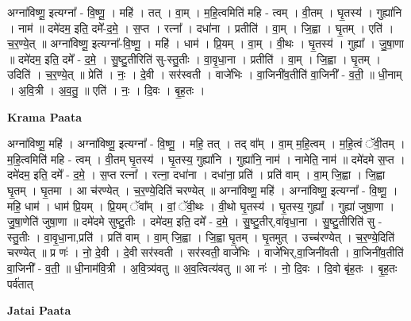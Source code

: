 \documentclass[17pt]{extarticle}
\begin{document}
अग्ना॑विष्णू॒ इत्यग्ना᳚ - वि॒ष्णू॒ । महि॑ । तत् । वा॒म् । म॒हि॒त्वमिति॑ महि - त्वम् । वी॒तम् । घृ॒तस्य॑ । गुह्या॑नि । नाम॑ ॥ दमे॑दम॒ इति॒ दमे᳚-द॒मे॒ । स॒प्त । रत्ना᳚ । दधा॑ना । प्रतीति॑ । वा॒म् । जि॒ह्वा । घृ॒तम् । एति॑ । च॒र॒ण्ये॒त् ॥ अग्ना॑विष्णू॒ इत्यग्ना᳚-वि॒ष्णू॒ । महि॑ । धाम॑ । प्रि॒यम् । वा॒म् । वी॒थः । घृ॒तस्य॑ । गुह्या᳚ । जु॒षा॒णा ॥ दमे॑दम॒ इति॒ दमे᳚ - द॒मे॒ । सु॒ष्टु॒तीरिति॑ सु-स्तु॒तीः । वा॒वृ॒धा॒ना । प्रतीति॑ । वा॒म् । जि॒ह्वा । घृ॒तम् । उदिति॑ । च॒र॒ण्ये॒त् ॥ प्रेति॑ । नः॒ । दे॒वी । सर॑स्वती । वाजे॑भिः । वा॒जिनी॑व॒तीति॑ वा॒जिनी᳚ - व॒ती॒ ॥ धी॒नाम् । अ॒वि॒त्री । अ॒व॒तु॒ ॥ एति॑ । नः॒ । दि॒वः । बृ॒ह॒तः ।  \newline


\textbf{Krama Paata} \newline

अग्ना॑विष्णू॒ महि॑ । अग्ना॑विष्णू॒ इत्यग्ना᳚ - वि॒ष्णू॒ । महि॒ तत् । तद् वा᳚म् । वा॒म् म॒हि॒त्वम् । म॒हि॒त्वं ॅवी॒तम् । म॒हि॒त्वमिति॑ महि - त्वम् । वी॒तम् घृ॒तस्य॑ । घृ॒तस्य॒ गुह्या॑नि । गुह्या॑नि॒ नाम॑ । नामेति॒ नाम॑ ॥ दमे॑दमे स॒प्त । दमे॑दम॒ इति॒ दमे᳚ - द॒मे॒ । स॒प्त रत्ना᳚ । रत्ना॒ दधा॑ना । दधा॑ना॒ प्रति॑ । प्रति॑ वाम् । वा॒म् जि॒ह्वा । जि॒ह्वा घृ॒तम् । घृ॒तमा । आ च॑रण्येत् । च॒र॒ण्ये॒दिति॑ चरण्येत् ॥ अग्ना॑विष्णू॒ महि॑ । अग्ना॑विष्णू॒ इत्यग्ना᳚ - वि॒ष्णू॒ । महि॒ धाम॑ । धाम॑ प्रि॒यम् । प्रि॒यम् ॅवा᳚म् । वां॒ ॅवी॒थः । वी॒थो घृ॒तस्य॑ । घृ॒तस्य॒ गुह्या᳚ । गुह्या॑ जुषा॒णा । जु॒षा॒णेति॑ जुषा॒णा ॥ दमे॑दमे सुष्टु॒तीः । दमे॑दम॒ इति॒ दमे᳚ - द॒मे॒ । सु॒ष्टु॒तीर्,वा॑वृधा॒ना । सु॒ष्टु॒तीरिति॑ सु - स्तु॒तीः । वा॒वृ॒धा॒ना,प्रति॑ । प्रति॑ वाम् । वा॒म् जि॒ह्वा । जि॒ह्वा घृ॒तम् । घृ॒तमुत् । उच्च॑रण्येत् । च॒र॒ण्ये॒दिति॑ चरण्येत् ॥ प्र णः॑ । नो॒ दे॒वी । दे॒वी सर॑स्वती । सर॑स्वती॒ वाजे॑भिः । वाजे॑भिर्,वा॒जिनी॑वती । वा॒जिनी॑व॒तीति॑ वा॒जिनी᳚ - व॒ती॒ ॥ धी॒नाम॑वि॒त्री । अ॒वि॒त्र्य॑वतु ॥ अ॒व॒त्वित्य॑वतु ॥ आ नः॑ । नो॒ दि॒वः । दि॒वो बृ॑ह॒तः । बृ॒ह॒तः पर्व॑तात् \newline

\textbf{Jatai Paata} \newline
\end{document}

